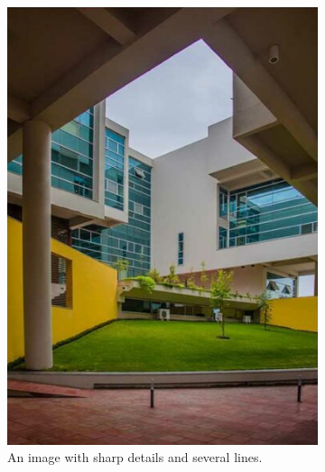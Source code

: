 \documentclass[addpoints]{exam}
\begin{document}
\begin{figure}
  \centering
  \begin{subfigure}{.31\textwidth}
    \includegraphics[width=\textwidth]{campus}
    \caption{An image with sharp details and several lines.}\label{fig:mask-orig}
  \end{subfigure}
  \begin{subfigure}[c]{.31\textwidth}

\end{subfigure}
\end{figure}
\end{document}
